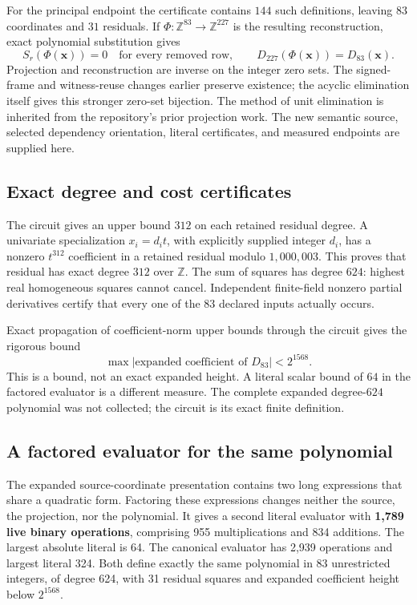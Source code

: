 \documentclass[11pt]{article}
\theoremstyle{remark}
\newcommand{\Z}{\mathbb Z}
\begin{document}
For the principal endpoint the certificate contains \(144\) such
definitions, leaving \(83\) coordinates and \(31\) residuals.
If \(\Phi:\Z^{83}\to\Z^{227}\) is the resulting reconstruction, exact
polynomial substitution gives
\[
 S_r(\Phi(\boldsymbol x))=0
 \quad\text{for every removed row},\qquad
 D_{227}(\Phi(\boldsymbol x))=D_{83}(\boldsymbol x).
 \tag{Restore}
\]
Projection and reconstruction are inverse on the integer zero sets.
The signed-frame and witness-reuse changes earlier preserve existence;
the acyclic elimination itself gives this stronger zero-set bijection.
The method of unit elimination is inherited from the repository's prior
projection work. The new semantic source, selected dependency orientation,
literal certificates, and measured endpoints are supplied here.

\subsection{Exact degree and cost certificates}

The circuit gives an upper bound \(312\) on each retained residual degree.
A univariate specialization \(x_i=d_i t\), with explicitly supplied
integer \(d_i\), has a nonzero \(t^{312}\) coefficient in a retained
residual modulo \(1{,}000{,}003\). This proves that residual has exact
degree \(312\) over \(\Z\).
The sum of squares has degree \(624\): highest real homogeneous squares
cannot cancel. Independent finite-field nonzero partial derivatives
certify that every one of the \(83\) declared inputs actually occurs.

Exact propagation of coefficient-norm upper bounds through the circuit
gives the rigorous bound
\[
 \max |\text{expanded coefficient of }D_{83}|<2^{1568}.
\]
This is a bound, not an exact expanded height. A literal scalar bound
of \(64\) in the factored evaluator is a different measure. The complete expanded degree-\(624\)
polynomial was not collected; the circuit is its exact finite definition.


\subsection{A factored evaluator for the same polynomial}
\label{sec:factored-evaluator}

The expanded source-coordinate presentation contains two long expressions
that share a quadratic form. Factoring these expressions changes neither
the source, the projection, nor the polynomial. It gives a second literal
evaluator with \textbf{1,789 live binary operations}, comprising 955
multiplications and 834 additions. The largest absolute literal is 64.
The canonical evaluator has 2,939 operations and largest literal 324.
Both define exactly the same polynomial in 83 unrestricted integers, of
degree 624, with 31 residual squares and expanded coefficient height below
$2^{1568}$.
\end{document}
